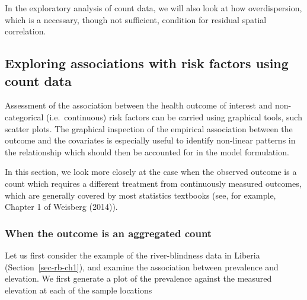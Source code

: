 \documentclass[
  letterpaper,
]{krantz}
\newenvironment{Shaded}{\begin{snugshade}}{\end{snugshade}}
\newcommand{\AttributeTok}[1]{\textcolor[rgb]{0.40,0.45,0.13}{#1}}
\newcommand{\FunctionTok}[1]{\textcolor[rgb]{0.28,0.35,0.67}{#1}}
\newcommand{\NormalTok}[1]{\textcolor[rgb]{0.00,0.23,0.31}{#1}}
\newcommand{\OtherTok}[1]{\textcolor[rgb]{0.00,0.23,0.31}{#1}}
\newcommand{\SpecialCharTok}[1]{\textcolor[rgb]{0.37,0.37,0.37}{#1}}
\newcommand{\StringTok}[1]{\textcolor[rgb]{0.13,0.47,0.30}{#1}}
\begin{document}
In the exploratory analysis of count data, we will also look at how
overdispersion, which is a necessary, though not sufficient, condition
for residual spatial correlation.

\hypertarget{exploring-associations-with-risk-factors-using-count-data}{%
\subsection{Exploring associations with risk factors using count
data}\label{exploring-associations-with-risk-factors-using-count-data}}

Assessment of the association between the health outcome of interest and
non-categorical (i.e.~continuous) risk factors can be carried using
graphical tools, such scatter plots. The graphical inspection of the
empirical association between the outcome and the covariates is
especially useful to identify non-linear patterns in the relationship
which should then be accounted for in the model formulation.

In this section, we look more closely at the case when the observed
outcome is a count which requires a different treatment from
continuously measured outcomes, which are generally covered by most
statistics textbooks (see, for example, Chapter 1 of Weisberg (2014)).

\hypertarget{when-the-outcome-is-an-aggregated-count}{%
\subsubsection{When the outcome is an aggregated
count}\label{when-the-outcome-is-an-aggregated-count}}

Let us first consider the example of the river-blindness data in Liberia
(Section~\ref{sec-rb-ch1}), and examine the association between
prevalence and elevation. We first generate a plot of the prevalence
against the measured elevation at each of the sample locations

\begin{Shaded}
\end{Shaded}
\end{document}
